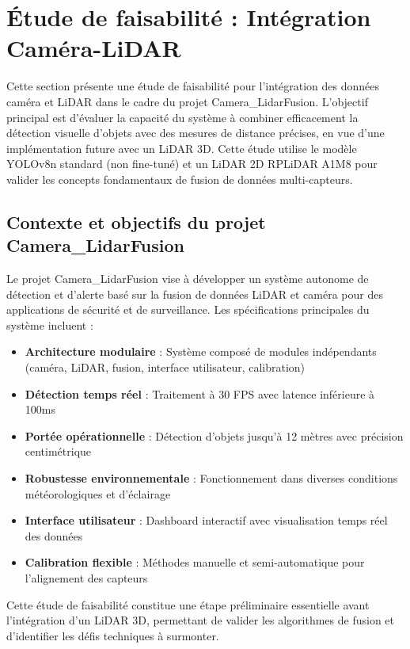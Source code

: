 \section{Étude de faisabilité : Intégration Caméra-LiDAR}
\label{sec:fusion_camera_lidar}

Cette section présente une étude de faisabilité pour l'intégration des données caméra et LiDAR dans le cadre du projet Camera\_LidarFusion. L'objectif principal est d'évaluer la capacité du système à combiner efficacement la détection visuelle d'objets avec des mesures de distance précises, en vue d'une implémentation future avec un LiDAR 3D. Cette étude utilise le modèle YOLOv8n standard (non fine-tuné) et un LiDAR 2D RPLiDAR A1M8 pour valider les concepts fondamentaux de fusion de données multi-capteurs.

\subsection{Contexte et objectifs du projet Camera\_LidarFusion}
\label{sec:contexte_projet}

Le projet Camera\_LidarFusion vise à développer un système autonome de détection et d'alerte basé sur la fusion de données LiDAR et caméra pour des applications de sécurité et de surveillance. Les spécifications principales du système incluent :

\begin{itemize}
    \item \textbf{Architecture modulaire} : Système composé de modules indépendants (caméra, LiDAR, fusion, interface utilisateur, calibration)
    \item \textbf{Détection temps réel} : Traitement à 30 FPS avec latence inférieure à 100ms
    \item \textbf{Portée opérationnelle} : Détection d'objets jusqu'à 12 mètres avec précision centimétrique
    \item \textbf{Robustesse environnementale} : Fonctionnement dans diverses conditions météorologiques et d'éclairage
    \item \textbf{Interface utilisateur} : Dashboard interactif avec visualisation temps réel des données
    \item \textbf{Calibration flexible} : Méthodes manuelle et semi-automatique pour l'alignement des capteurs
\end{itemize}

Cette étude de faisabilité constitue une étape préliminaire essentielle avant l'intégration d'un LiDAR 3D, permettant de valider les algorithmes de fusion et d'identifier les défis techniques à surmonter.

